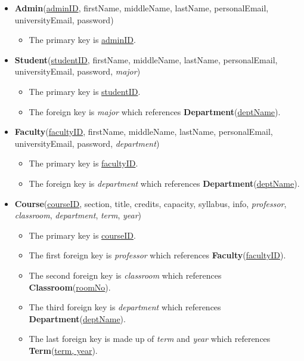 \documentclass{report}
\begin{document}
\begin{itemize}

    \item \textbf{Admin}(\underline{adminID}, firstName, middleName, lastName, personalEmail, universityEmail, password)
    \begin{itemize}
        \item The primary key is \underline{adminID}.
    \end{itemize}

    \item \textbf{Student}(\underline{studentID}, firstName, middleName, lastName, personalEmail, universityEmail, password, \textit{major})
    \begin{itemize}
        \item The primary key is \underline{studentID}.
        \item The foreign key is \textit{major} which references \textbf{Department}(\underline{deptName}).
    \end{itemize}

    \item \textbf{Faculty}(\underline{facultyID}, firstName, middleName, lastName, personalEmail, universityEmail, password, \textit{department})
    \begin{itemize}
        \item The primary key is \underline{facultyID}.
        \item The foreign key is \textit{department} which references \textbf{Department}(\underline{deptName}).
    \end{itemize}

    \item \textbf{Course}(\underline{courseID}, section, title, credits, capacity, syllabus, info, \textit{professor}, \textit{classroom}, \textit{department}, \textit{term}, \textit{year})
    \begin{itemize}
        \item The primary key is \underline{courseID}.
        \item The first foreign key is \textit{professor} which references \textbf{Faculty}(\underline{facultyID}).
        \item The second foreign key is \textit{classroom} which references \textbf{Classroom}(\underline{roomNo}).
        \item The third foreign key is \textit{department} which references \textbf{Department}(\underline{deptName}).
        \item The last foreign key is made up of \textit{term} and \textit{year} which references \textbf{Term}(\underline{term, year}).
    \end{itemize}


\end{itemize}
\end{document}
